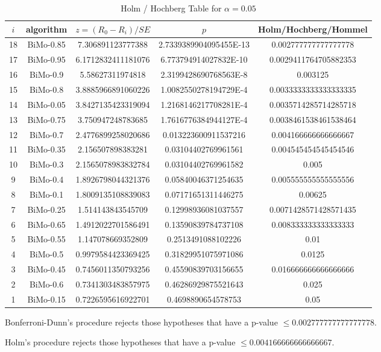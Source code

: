 \documentclass[a4paper,10pt]{article}
\begin{document}
\begin{landscape}
\begin{table}[!htp]
\centering\tiny
\caption{Holm / Hochberg Table for $\alpha=0.05$}
\begin{tabular}{ccccc}
$i$&algorithm&$z=(R_0 - R_i)/SE$&$p$&Holm/Hochberg/Hommel\\
\hline
18&BiMo-0.85&7.306891123777388&2.7339389904095455E-13&0.002777777777777778\\
17&BiMo-0.95&6.1712832411181076&6.773794914027832E-10&0.0029411764705882353\\
16&BiMo-0.9&5.58627311974818&2.3199428690768563E-8&0.003125\\
15&BiMo-0.8&3.8885966891060226&1.0082550278194729E-4&0.0033333333333333335\\
14&BiMo-0.05&3.8427135423319094&1.2168146217708281E-4&0.0035714285714285718\\
13&BiMo-0.75&3.750947248783685&1.7616776384944127E-4&0.0038461538461538464\\
12&BiMo-0.7&2.4776899258020686&0.013223600911537216&0.004166666666666667\\
11&BiMo-0.35&2.156507898383281&0.03104402769961561&0.004545454545454546\\
10&BiMo-0.3&2.1565078983832784&0.03104402769961582&0.005\\
9&BiMo-0.4&1.8926798044321376&0.05840046371254635&0.005555555555555556\\
8&BiMo-0.1&1.8009135108839083&0.07171651311446275&0.00625\\
7&BiMo-0.25&1.514143843545709&0.12998936081037557&0.0071428571428571435\\
6&BiMo-0.65&1.4912022701586491&0.13590839784737108&0.008333333333333333\\
5&BiMo-0.55&1.147078669352809&0.2513491088102226&0.01\\
4&BiMo-0.5&0.9979584423369425&0.31829951075971086&0.0125\\
3&BiMo-0.45&0.7456011350793256&0.45590839703156655&0.016666666666666666\\
2&BiMo-0.6&0.7341303483857975&0.46286929875521643&0.025\\
1&BiMo-0.15&0.7226595616922701&0.4698890654578753&0.05\\
\hline
\end{tabular}
\end{table}
Bonferroni-Dunn's procedure rejects those hypotheses that have a p-value $\le0.002777777777777778$.


Holm's procedure rejects those hypotheses that have a p-value $\le0.004166666666666667$.



\end{landscape}
\end{document}

